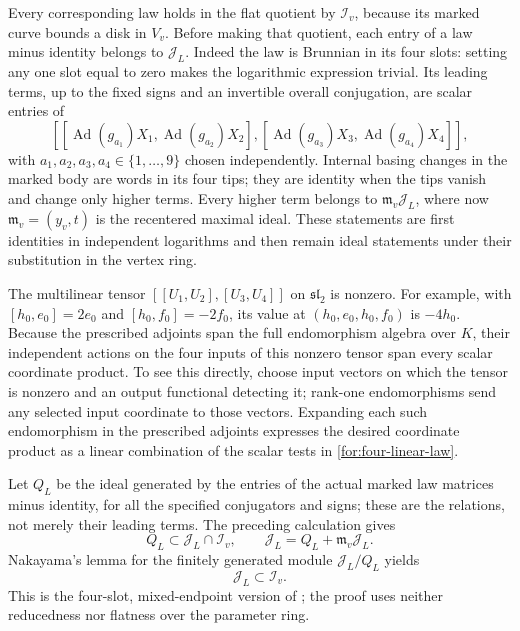 Every corresponding law holds in the flat quotient by
$\mathcal I_v$, because its marked curve bounds a disk in $V_v$.
Before making that quotient, each entry of a law minus identity
belongs to $\mathcal J_L$.  Indeed the law is Brunnian in its four
slots: setting any one slot equal to zero makes the logarithmic
expression trivial.  Its leading terms, up to the fixed signs and an
invertible overall conjugation, are scalar entries of
\begin{equation}
\label{for:four-linear-law}
 [[\operatorname{Ad}(g_{a_1})X_1,\operatorname{Ad}(g_{a_2})X_2],
   [\operatorname{Ad}(g_{a_3})X_3,\operatorname{Ad}(g_{a_4})X_4]],
\end{equation}
with $a_1,a_2,a_3,a_4\in\{1,\ldots,9\}$ chosen independently.
Internal basing changes
in the marked body are words in its four tips; they are identity when
the tips vanish and change only higher terms.  Every higher term
belongs to $\mathfrak m_v\mathcal J_L$, where now
$\mathfrak m_v=(y_v,t)$ is the recentered maximal ideal.  These
statements are first identities in independent logarithms and then
remain ideal statements under their substitution in the vertex ring.

The multilinear tensor $[[U_1,U_2],[U_3,U_4]]$ on
$\mathfrak{sl}_2$ is nonzero.  For example, with
$[h_0,e_0]=2e_0$ and $[h_0,f_0]=-2f_0$, its value at
$(h_0,e_0,h_0,f_0)$ is $-4h_0$.  Because the prescribed adjoints
span the full endomorphism algebra over $K$, their independent
actions on the four inputs of this nonzero tensor span every scalar
coordinate product.  To see this directly, choose input vectors on
which the tensor is nonzero and an output functional detecting it;
rank-one endomorphisms send any selected input coordinate to those
vectors.  Expanding each such endomorphism in the prescribed adjoints
expresses the desired coordinate product as a linear combination of
the scalar tests in \eqref{for:four-linear-law}.

Let $Q_L$ be the ideal generated by the entries of the actual marked
law matrices minus identity, for all the specified conjugators and
signs; these are the relations, not merely their leading terms.
The preceding calculation gives
\[
 Q_L\subset\mathcal J_L\cap\mathcal I_v,
 \qquad \mathcal J_L=Q_L+\mathfrak m_v\mathcal J_L.
\]
Nakayama's lemma for the finitely generated module
$\mathcal J_L/Q_L$ yields
\begin{equation}
\label{for:four-product-ideal}
 \mathcal J_L\subset\mathcal I_v.
\end{equation}
This is the four-slot, mixed-endpoint version of
\cite[Lemma~6.6]{MT}; the proof uses neither reducedness nor flatness
over the parameter ring.

